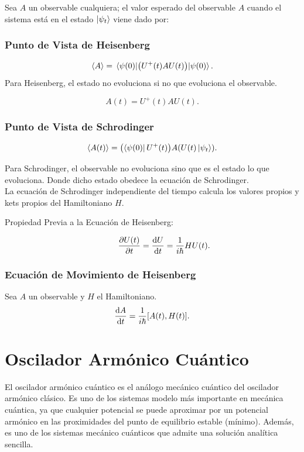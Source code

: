 Sea $A$ un observable cualquiera; el valor esperado del observable $A$ cuando el sistema está en el estado $\ket{\psi_{t} }$ viene dado por:
\subsection{Punto de Vista de Heisenberg}
	$$ \expval{A} = \expval{\qty(U^+ (t) A U (t))}{\psi (0)}. $$
Para Heisenberg, el estado no evoluciona si no que evoluciona el observable.

	$$ A(t) = U^+ (t) AU(t). $$
	
\subsection{Punto de Vista de Schrodinger}
	$$ \expval{A(t)} = \qty(\bra{\psi (0)} U^+ (t)) A \qty(U(t) \ket{\psi_{t} }). $$

Para Schrodinger, el observable no evoluciona sino que es el estado lo que evoluciona. Donde dicho estado obedece la ecuación de Schrodinger. \\
La ecuación de Schrodinger independiente del tiempo calcula los valores propios y kets propios del Hamiltoniano $H$.

\begin{description}
	\item[Propiedad Previa a la Ecuación de Heisenberg: ] 
		$$ \pdv{U(t)}{t} = \dv{U}{t} = \frac{1}{i\hbar} HU(t). $$ 
\end{description}


\subsection{Ecuación de Movimiento de Heisenberg}
Sea $A$ un observable y $H$ el Hamiltoniano.
	$$ \dv{A}{t} = \frac{1}{i\hbar} [A(t),H(t)]. $$





\chapter{Oscilador Armónico Cuántico}
El oscilador armónico cuántico es el análogo mecánico cuántico del oscilador armónico clásico. Es uno de los sistemas modelo más importante en mecánica cuántica, ya que cualquier potencial se puede aproximar por un potencial armónico en las proximidades del punto de equilibrio estable (mínimo). Además, es uno de los sistemas mecánico cuánticos que admite una solución analítica sencilla.


